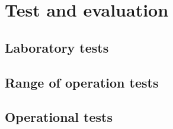 \chapter{Test and evaluation} \label{sec:tests}

\section{Laboratory tests}


\section{Range of operation tests}

\section{Operational tests}
